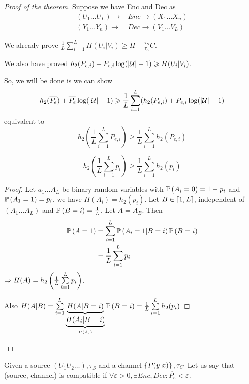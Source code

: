 \begin{proof}[Proof of the theorem]
    Suppose we have Enc and Dec as
    \[
        \begin{aligned}
            (U_1\ldots U_L) \to &Enc \to (X_1\ldots X_n)\\
            (Y_1\ldots Y_n) \to &Dec \to (V_1\ldots V_L)
        \end{aligned}   
    \]
    
    We already prove $\frac{1}{L}\sum\limits_{i=1}^L H(U_i \vert V_i) \geqslant H-\frac{\tau_S}{\tau_C} C$.
    
    We also have proved $h_2(P_{e,i}) + P_{e,i}\log(\lvert \mathcal{U}\rvert -1) \geqslant H(U_i \vert V_i)$.
    
    So, we will be done is we can show
    \[
        h_2(\overline{P_e}) + \overline{P_e}\log(\lvert \mathcal{U}\rvert -1) \geqslant \frac{1}{L} \sum\limits_{i=1}^L (h_2(P_{e,i}) + P_{e,i} \log(\left\lvert\mathcal{U}\right\rvert -1)
    \]
    equivalent to
    \[
        h_2\left( \frac{1}{L} \sum\limits_{i=1}^L P_{e,i} \right) \geqslant \frac{1}{L} \sum\limits_{i=1}^L h_2(P_{e,i})
    \]
    \begin{lemma}
        \[
            h_2\left( \frac{1}{L} \sum\limits_{i=1}^L p_i \right) \geqslant \frac{1}{L} \sum\limits_{i=1}^L h_2(p_i)
        \]
    \end{lemma}        
    \begin{proof}
        Let $a_1\ldots A_L$ be binary random variables with $\mathbb{P}\left( A_i = 0 \right) = 1-p_i$ and $\mathbb{P}\left( A_1 = 1 \right) = p_i$, we have $H(A_i) = h_2(p_i)$. Let $B\in \left\llbracket 1,L \right\rrbracket$, independent of $(A_1\ldots A_L)$ and $\mathbb{P}\left( B=i \right) = \frac{1}{L}$. Let $A=A_B$. Then 
        \[
            \begin{aligned}
                \mathbb{P}\left( A = 1 \right) &= \sum\limits_{i=1}^L\mathbb{P}\left( A_i = 1 \vert B=i \right)\mathbb{P}\left( B=i \right)\\
                &= \frac{1}{L} \sum\limits_{i=1}^L p_i
            \end{aligned}                    
        \]
        $\Rightarrow H(A) = h_2\left( \frac{1}{L} \sum\limits_{i=1}^L p_i \right)$.
        
        Also $H(A\vert B) = \sum\limits_{i=1}^L \underbrace{H(A\vert B=i)}_{\underbrace{H(A_i\vert B=i)}_{H(A_i)}}\mathbb{P}\left( B=i \right) = \frac{1}{L}\sum\limits_{i=1}^L h_2(p_i)$
    \end{proof}
\end{proof}

Given a source $(U_1U_2\ldots), \tau_S$ and a channel $\left\{ P(y\vert x) \right\}, \tau_C$ Let us say that (source, channel) is compatible if $\forall \varepsilon > 0,\exists Enc, Dec: \overline{P_e} < \varepsilon$.

